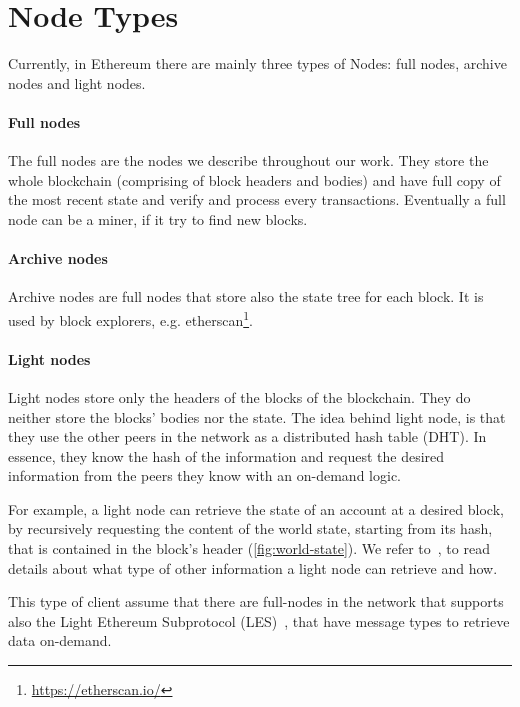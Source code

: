 \section{Node Types}
\label{sec:node-types}
Currently, in Ethereum there are mainly three types of Nodes: full nodes,
archive nodes and light nodes.

\paragraph{Full nodes}
The full nodes are the nodes we describe throughout our work. They store the
whole blockchain (comprising of block headers and bodies) and have full
copy of the most recent state and verify and process every transactions. 
Eventually a full node can be a miner, if it try to find new blocks.

\paragraph{Archive nodes}
Archive nodes are full nodes that store also the state tree for each block. It
is used by block explorers, e.g.
etherscan\footnote{\url{https://etherscan.io/}}.

\paragraph{Light nodes}
Light nodes store only the headers of the blocks of the blockchain. They do
neither store the blocks' bodies nor the state. The idea behind light node,
is that they use the other peers in the network as a distributed hash table 
(DHT). In essence, they know the hash of the information and request the
desired information from the peers they know with an on-demand logic. 

For example, a light node can retrieve the state of an account at a 
desired block, by recursively requesting the content of the world state, 
starting from its hash, that is contained in the block's header
(\autoref{fig:world-state}). We refer to~\cite{bib:light-client}, to read 
details about what type of other information a light node can retrieve and how.

This type of client assume that there are full-nodes in the network that 
supports also the Light Ethereum Subprotocol (LES)~\cite{bib:les-protocol}, 
that have message types to retrieve data on-demand.
